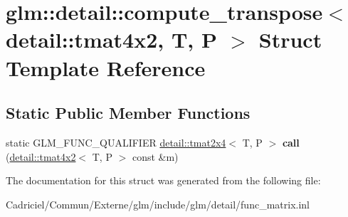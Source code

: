 \hypertarget{structglm_1_1detail_1_1compute__transpose_3_01detail_1_1tmat4x2_00_01_t_00_01_p_01_4}{}\section{glm\+:\+:detail\+:\+:compute\+\_\+transpose$<$ detail\+:\+:tmat4x2, T, P $>$ Struct Template Reference}
\label{structglm_1_1detail_1_1compute__transpose_3_01detail_1_1tmat4x2_00_01_t_00_01_p_01_4}
\subsection*{Static Public Member Functions}
\begin{DoxyCompactItemize}
\item 
static G\+L\+M\+\_\+\+F\+U\+N\+C\+\_\+\+Q\+U\+A\+L\+I\+F\+I\+ER \hyperlink{structglm_1_1detail_1_1tmat2x4}{detail\+::tmat2x4}$<$ T, P $>$ {\bfseries call} (\hyperlink{structglm_1_1detail_1_1tmat4x2}{detail\+::tmat4x2}$<$ T, P $>$ const \&m)\hypertarget{structglm_1_1detail_1_1compute__transpose_3_01detail_1_1tmat4x2_00_01_t_00_01_p_01_4_a345735a0a7bc0fa49d41693771b8c72e}{}\label{structglm_1_1detail_1_1compute__transpose_3_01detail_1_1tmat4x2_00_01_t_00_01_p_01_4_a345735a0a7bc0fa49d41693771b8c72e}

\end{DoxyCompactItemize}


The documentation for this struct was generated from the following file\+:\begin{DoxyCompactItemize}
\item 
Cadriciel/\+Commun/\+Externe/glm/include/glm/detail/func\+\_\+matrix.\+inl\end{DoxyCompactItemize}
